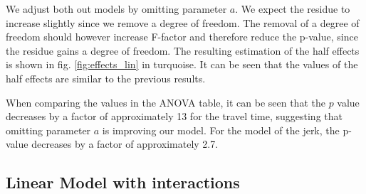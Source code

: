 
We adjust both out models by omitting parameter $a$. We expect the residue to increase slightly since we remove a degree of freedom. The removal of a degree of freedom should however increase F-factor and therefore reduce the p-value, since the residue gains a degree of freedom. The resulting estimation of the half effects is shown in fig. \ref{fig:effects_lin} in turquoise. It can be seen that the values of the half effects are similar to the previous results.

When comparing the values in the ANOVA table, it can be seen that the $p$ value decreases by a factor of approximately 13 for the travel time, suggesting that omitting parameter $a$ is improving our model. For the model of the jerk, the p-value decreases by a factor of approximately 2.7.


\subsection{Linear Model with interactions}

